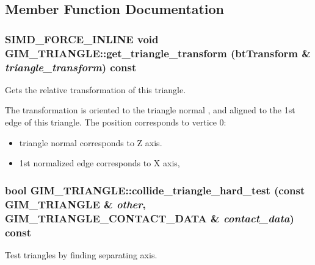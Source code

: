 \subsection{Member Function Documentation}
\hypertarget{class_g_i_m___t_r_i_a_n_g_l_e_500db747a4c740b3de1756336263a53d}{
\subsubsection[get\_\-triangle\_\-transform]{\setlength{\rightskip}{0pt plus 5cm}SIMD\_\-FORCE\_\-INLINE void GIM\_\-TRIANGLE::get\_\-triangle\_\-transform (btTransform \& {\em triangle\_\-transform}) const}}
\label{class_g_i_m___t_r_i_a_n_g_l_e_500db747a4c740b3de1756336263a53d}


Gets the relative transformation of this triangle. 

The transformation is oriented to the triangle normal , and aligned to the 1st edge of this triangle. The position corresponds to vertice 0:\begin{itemize}
\item triangle normal corresponds to Z axis.\item 1st normalized edge corresponds to X axis, \end{itemize}
\hypertarget{class_g_i_m___t_r_i_a_n_g_l_e_0ec3d21ba17dec3cfecbe8ff34b85072}{
\subsubsection[collide\_\-triangle\_\-hard\_\-test]{\setlength{\rightskip}{0pt plus 5cm}bool GIM\_\-TRIANGLE::collide\_\-triangle\_\-hard\_\-test (const {\bf GIM\_\-TRIANGLE} \& {\em other}, \/  {\bf GIM\_\-TRIANGLE\_\-CONTACT\_\-DATA} \& {\em contact\_\-data}) const}}
\label{class_g_i_m___t_r_i_a_n_g_l_e_0ec3d21ba17dec3cfecbe8ff34b85072}


Test triangles by finding separating axis. 

